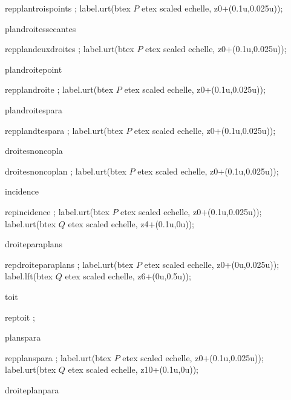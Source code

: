 {{{\begin{mpost}[mpsettings={u=\scaleminischemspace*1cm;echelle=\scaleminischemspace;}]
				repplantroispoints ;
				label.urt(btex $P$ etex scaled echelle, z0+(0.1u,0.025u));
			\end{mpost}
		}%
		{plandroitessecantes}{%
			\begin{mpost}[mpsettings={u=\scaleminischemspace*1cm;echelle=\scaleminischemspace;}]
				repplandeuxdroites ;
				label.urt(btex $P$ etex scaled echelle, z0+(0.1u,0.025u));
			\end{mpost}
		}%
		{plandroitepoint}{%
			\begin{mpost}[mpsettings={u=\scaleminischemspace*1cm;echelle=\scaleminischemspace;}]
				repplandroite ;
				label.urt(btex $P$ etex scaled echelle, z0+(0.1u,0.025u));
			\end{mpost}
		}%
		{plandroitespara}{%
			\begin{mpost}[mpsettings={u=\scaleminischemspace*1cm;echelle=\scaleminischemspace;}]
				repplandtespara ;
				label.urt(btex $P$ etex scaled echelle, z0+(0.1u,0.025u));
			\end{mpost}
		}%
		{droitesnoncopla}{%
			\begin{mpost}[mpsettings={u=\scaleminischemspace*1cm;echelle=\scaleminischemspace;}]
				droitesnoncoplan ;
				label.urt(btex $P$ etex scaled echelle, z0+(0.1u,0.025u));
			\end{mpost}
		}%
		{incidence}{%
			\begin{mpost}[mpsettings={u=\scaleminischemspace*1cm;echelle=\scaleminischemspace;}]
				repincidence ;
				label.urt(btex $P$ etex scaled echelle, z0+(0.1u,0.025u));
				label.urt(btex $Q$ etex scaled echelle, z4+(0.1u,0u));
			\end{mpost}
		}%
		{droiteparaplans}{%
			\begin{mpost}[mpsettings={u=\scaleminischemspace*1cm;echelle=\scaleminischemspace;}]
				repdroiteparaplans ;
				label.urt(btex $P$ etex scaled echelle, z0+(0u,0.025u));
				label.lft(btex $Q$ etex scaled echelle, z6+(0u,0.5u));
			\end{mpost}
		}%
		{toit}{%
			\begin{mpost}[mpsettings={u=\scaleminischemspace*1cm;echelle=\scaleminischemspace;}]
				reptoit ;
			\end{mpost}
		}%
		{planspara}{%
			\begin{mpost}[mpsettings={u=\scaleminischemspace*1cm;echelle=\scaleminischemspace;}]
				repplanspara ;
				label.urt(btex $P$ etex scaled echelle, z0+(0.1u,0.025u));
				label.urt(btex $Q$ etex scaled echelle, z10+(0.1u,0u));
			\end{mpost}
		}%
		{droiteplanpara}{%
}}}
